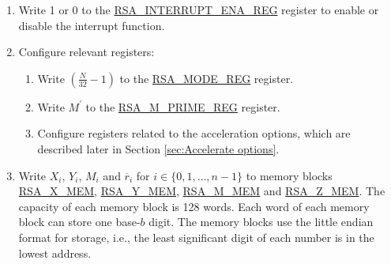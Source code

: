 \documentclass[main\_\_EN.tex]{subfiles}
\begin{document}
\begin{enumerate}

    \item Write 1 or 0 to the \hyperref[regdesc:RSAINTERRUPTENAREG]{RSA\_INTERRUPT\_ENA\_REG} register to enable or disable the interrupt function.

    \item Configure relevant registers:

    \begin{enumerate}
        \item Write \begin{math}( \frac{N}{32} - 1 )\end{math} to the \hyperref[regdesc:RSAMODEXPMODEREG]{RSA\_MODE\_REG} register.

        \item Write \begin{math}M^{\prime}\end{math} to the \hyperref[regdesc:RSAMPRIMEREG]{RSA\_M\_PRIME\_REG} register.

        \item Configure registers related to the acceleration options, which are described later in Section \ref{sec:Accelerate options}.

    \end{enumerate}

    \item Write
        \begin{math}X_{i}\end{math},
        \begin{math}Y_{i}\end{math},
        \begin{math}M_{i}\end{math} and
        \begin{math}\overline{r}_{i}\end{math} for \begin{math}i \in \{ 0, 1, \dots, n-1 \} \end{math}
        to memory blocks \hyperref[regdesc:RSAmemory]{RSA\_X\_MEM}, \hyperref[regdesc:RSAmemory]{RSA\_Y\_MEM}, \hyperref[regdesc:RSAmemory]{RSA\_M\_MEM} and \hyperref[regdesc:RSAmemory]{RSA\_Z\_MEM}. The capacity of each memory block is 128 words. Each word of each memory block can store one base-\begin{math}b\end{math} digit. The memory blocks use the little endian format for storage, i.e., the least significant digit of each number is in the lowest address.


\end{enumerate}
\end{document}
